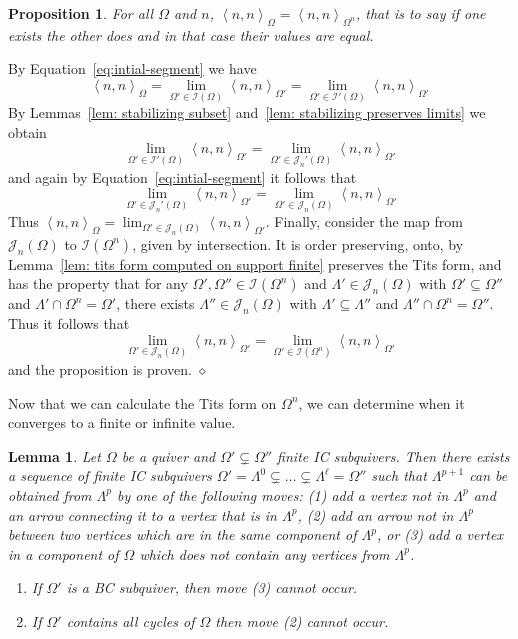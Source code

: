 \documentclass{article}
\newcommand{\bracket}[1]{\left \langle #1 \right\rangle}
\newtheorem{lemma}{Lemma}[section]
\newtheorem{proposition}{Proposition}[section]
\newenvironment{proof}{\vspace*{2ex}\noindent {\em Proof:}
}{\hfill $\diamond$ \\[2ex]}
\begin{document}
\begin{proposition} \label{prop: limit computed by support}
For all $\Omega$ and $n$, $\bracket{n,  n}_\Omega = \bracket{n , n}_{\Omega^n}$, that is to say if one exists the other does and in that case their values are equal.
\end{proposition}

\begin{proof}
By Equation~\ref{eq:intial-segment} we have 
\[\bracket{n,n}_{\Omega} = \lim_{\Omega' \in \mathcal{I}(\Omega)} \bracket{n,n}_{\Omega'}=  \lim_{\Omega' \in \mathcal{I}'(\Omega)} \bracket{n,n}_{\Omega'}\]
By Lemmas~\ref{lem: stabilizing subset} and~\ref{lem: stabilizing preserves limits} we obtain
\[ \lim_{\Omega' \in \mathcal{I}'(\Omega)} \bracket{n,n}_{\Omega'}= \lim_{\Omega' \in \mathcal{J}_n'(\Omega)} \bracket{n,n}_{\Omega'}\]
and again by Equation~\ref{eq:intial-segment} it follows that
\[ \lim_{\Omega' \in \mathcal{J}_n'(\Omega)} \bracket{n,n}_{\Omega'}= \lim_{\Omega' \in \mathcal{J}_n(\Omega)} \bracket{n,n}_{\Omega'}\]
Thus $\bracket{n,n}_{\Omega} = \lim_{\Omega' \in \mathcal{J}_n(\Omega)} \bracket{n,n}_{\Omega'}$.
Finally, consider the map from $\mathcal{J}_n(\Omega)$ to $\mathcal{I}(\Omega^n)$, given by intersection.  It is order preserving, onto, by Lemma~\ref{lem: tits form computed on support finite} preserves the Tits form, and has the property that for any $\Omega' , \Omega'' \in \mathcal{I}(\Omega^n)$ and $\Lambda' \in \mathcal{J}_n(\Omega)$ with $\Omega' \subseteq \Omega''$ and $\Lambda' \cap \Omega^n = \Omega'$, there exists $\Lambda'' \in \mathcal{J}_n(\Omega)$ with $\Lambda' \subseteq \Lambda''$ and $\Lambda'' \cap \Omega^n = \Omega''$. Thus it follows that
  \[\lim_{\Omega' \in \mathcal{J}_n(\Omega)} \bracket{n,n}_{\Omega'}=\lim_{\Omega' \in \mathcal{I}(\Omega^n)} \bracket{n,n}_{\Omega'}\]
  and the proposition is proven.
\end{proof}

Now that we can calculate the Tits form on $\Omega^n$, we can determine when it converges to a finite or infinite value.  


\begin{lemma}\label{ref: sequence of IC subquivers}
    Let $\Omega$ be a quiver and $\Omega' \subsetneq \Omega''$ finite IC subquivers. Then there exists a sequence of finite IC subquivers $\Omega' = \Lambda^0 \subsetneq \ldots \subsetneq \Lambda^\ell =\Omega''$ such that $\Lambda^{p + 1}$ can be obtained from $\Lambda^p$ by one of the following moves: (1) add a vertex not in $\Lambda^p$ and an arrow connecting it to a vertex that is in $\Lambda^p$, (2) add an arrow not in $\Lambda^p$ between two vertices which are in the same component of $\Lambda^p$, or (3) add a vertex in a component of $\Omega$ which does not contain any vertices from $\Lambda^p$. 

    \begin{enumerate}
        \item If $\Omega'$ is a BC subquiver, then move (3) cannot occur. 
        \item If $\Omega'$ contains all cycles of $\Omega$ then move (2) cannot occur. 
    \end{enumerate}
\end{lemma}
\end{document}
